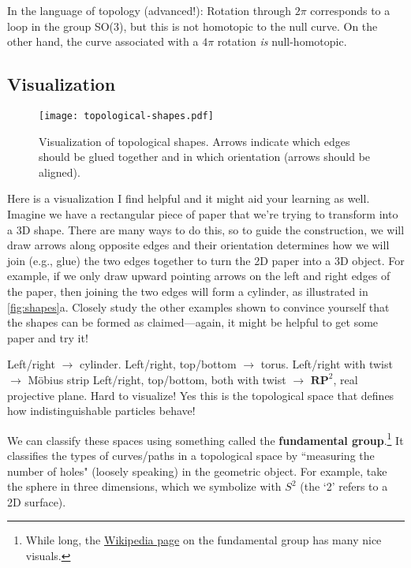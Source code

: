 \documentclass[12pt, english]{book}
\begin{document}
In the language of topology (advanced!): Rotation through $2\pi$ corresponds to a loop in the group SO(3), but this is not homotopic to the null curve.
On the other hand, the curve associated with a $4\pi$ rotation \emph{is} null-homotopic.

\subsection{Visualization}

\begin{figure}[!ht]
	\centering 
	\texttt{[image: topological-shapes.pdf]}
	\caption{Visualization of topological shapes. 
	Arrows indicate which edges should be glued together and in which orientation (arrows should be aligned).}
	\label{fig:shapes}
\end{figure}

Here is a visualization I find helpful and it might aid your learning as well.
Imagine we have a rectangular piece of paper that we're trying to transform into a 3D shape.
There are many ways to do this, so to guide the construction, we will draw arrows along opposite edges and their orientation determines how we will join (e.g., glue) the two edges together to turn the 2D paper into a 3D object.
For example, if we only draw upward pointing arrows on the left and right edges of the paper, then joining the two edges will form a cylinder, as illustrated in \autoref{fig:shapes}a.
Closely study the other examples shown to convince yourself that the shapes can be formed as claimed---again, it might be helpful to get some paper and try it!

Left/right $\rightarrow$ cylinder.
Left/right, top/bottom $\rightarrow$ torus.
Left/right with twist $\rightarrow$ M{\"o}bius strip
Left/right, top/bottom, both with twist $\rightarrow$ $\mathbf{RP}^2$, real projective plane.
Hard to visualize!
Yes this is the topological space that defines how indistinguishable particles behave!

We can classify these spaces using something called the \textbf{fundamental group}.\footnote{While long, the \href{https://en.wikipedia.org/wiki/Fundamental_group}{Wikipedia page} on the fundamental group has many nice visuals.}
It classifies the types of curves/paths in a topological space by ``measuring the number of holes" (loosely speaking) in the geometric object.
For example, take the sphere in three dimensions, which we symbolize with $S^2$ (the `2' refers to a 2D surface).
\end{document}
